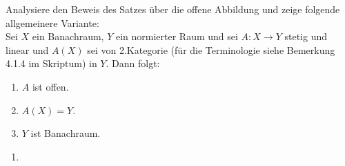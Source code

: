 \begin{exercise}
Analysiere den Beweis des Satzes über die offene Abbildung und zeige folgende
allgemeinere Variante: \\
Sei $X$ ein Banachraum, $Y$ ein normierter Raum und sei $A: X \rightarrow Y$ stetig
und linear und $A(X)$ sei von 2.Kategorie (für die Terminologie siehe Bemerkung
4.1.4 im Skriptum) in $Y$. Dann folgt:
\begin{enumerate}[label = (\roman*)]
  \item $A$ ist offen.
  \item $A(X) = Y$.
  \item $Y$ ist Banachraum.
\end{enumerate}
\end{exercise}
\begin{solution}
\begin{enumerate}[label = (\roman*)]
  \item
\end{enumerate}
\end{solution}
